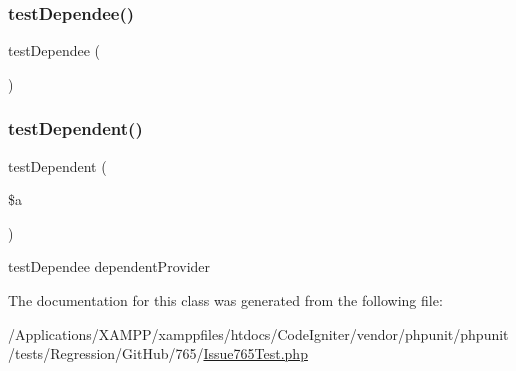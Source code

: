 \mbox{\label{class_issue765_test_a6e472ccc3253d4805e6a9d48be1ea3cc}} 
\subsubsection{\texorpdfstring{test\+Dependee()}{testDependee()}}
{\footnotesize\ttfamily test\+Dependee (\begin{DoxyParamCaption}{ }\end{DoxyParamCaption})}

\mbox{\label{class_issue765_test_af7619f4724aaab5bc645635d8a9bcf36}} 
\subsubsection{\texorpdfstring{test\+Dependent()}{testDependent()}}
{\footnotesize\ttfamily test\+Dependent (\begin{DoxyParamCaption}\item[{}]{\$a }\end{DoxyParamCaption})}

test\+Dependee  dependent\+Provider 

The documentation for this class was generated from the following file\+:\begin{DoxyCompactItemize}
\item 
/\+Applications/\+X\+A\+M\+P\+P/xamppfiles/htdocs/\+Code\+Igniter/vendor/phpunit/phpunit/tests/\+Regression/\+Git\+Hub/765/\mbox{\hyperlink{_issue765_test_8php}{Issue765\+Test.\+php}}\end{DoxyCompactItemize}
